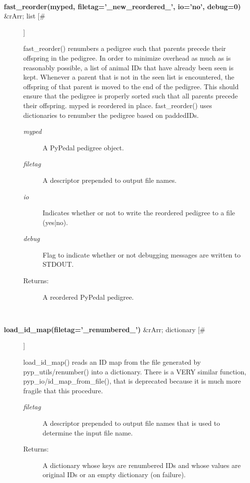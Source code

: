 \documentclass[10pt]{article}
\begin{document}
\begin{description}
\begin{description}
\end{description}
\\ 

\item[\textbf{fast\_reorder(myped, filetag='\_new\_reordered\_', io='no', debug=0)}
 \&rArr; list [\#]]

 fast\_reorder() renumbers a pedigree such that parents precede their offspring in the pedigree. In order to minimize overhead as much as is reasonably possible, a list of animal IDs that have already been seen is kept. Whenever a parent that is not in the seen list is encountered, the offspring of that parent is moved to the end of the pedigree. This should ensure that the pedigree is properly sorted such that all parents precede their offspring. myped is reordered in place. fast\_reorder() uses dictionaries to renumber the pedigree based on paddedIDs.
\begin{description}
\item[\emph{myped}
] A PyPedal pedigree object.
\item[\emph{filetag}
] A descriptor prepended to output file names.
\item[\emph{io}
] Indicates whether or not to write the reordered pedigree to a file (yes|no).
\item[\emph{debug}
] Flag to indicate whether or not debugging messages are written to STDOUT.
\item[Returns:] A reordered PyPedal pedigree.

\end{description}
\\ 

\item[\textbf{load\_id\_map(filetag='\_renumbered\_')}
 \&rArr; dictionary [\#]]

 load\_id\_map() reads an ID map from the file generated by pyp\_utils/renumber() into a dictionary. There is a VERY similar function, pyp\_io/id\_map\_from\_file(), that is deprecated because it is much more fragile that this procedure.
\begin{description}
\item[\emph{filetag}
] A descriptor prepended to output file names that is used to determine the input file name.
\item[Returns:] A dictionary whose keys are renumbered IDs and whose values are original IDs or an empty dictionary (on failure).

\end{description}
\\ 


\end{description}
\end{document}
